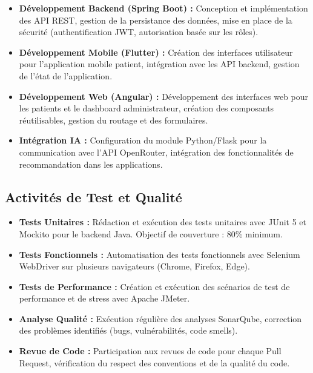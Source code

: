 \documentclass[12pt,a4paper]{report}
\begin{document}
\begin{itemize}
    \item \textbf{Développement Backend (Spring Boot) :} Conception et implémentation des API REST, gestion de la persistance des données, mise en place de la sécurité (authentification JWT, autorisation basée sur les rôles).
    
    \item \textbf{Développement Mobile (Flutter) :} Création des interfaces utilisateur pour l'application mobile patient, intégration avec les API backend, gestion de l'état de l'application.
    
    \item \textbf{Développement Web (Angular) :} Développement des interfaces web pour les patients et le dashboard administrateur, création des composants réutilisables, gestion du routage et des formulaires.
    
    \item \textbf{Intégration IA :} Configuration du module Python/Flask pour la communication avec l'API OpenRouter, intégration des fonctionnalités de recommandation dans les applications.
\end{itemize}

\subsection{Activités de Test et Qualité}

\begin{itemize}
    \item \textbf{Tests Unitaires :} Rédaction et exécution des tests unitaires avec JUnit 5 et Mockito pour le backend Java. Objectif de couverture : 80\% minimum.
    
    \item \textbf{Tests Fonctionnels :} Automatisation des tests fonctionnels avec Selenium WebDriver sur plusieurs navigateurs (Chrome, Firefox, Edge).
    
    \item \textbf{Tests de Performance :} Création et exécution des scénarios de test de performance et de stress avec Apache JMeter.
    
    \item \textbf{Analyse Qualité :} Exécution régulière des analyses SonarQube, correction des problèmes identifiés (bugs, vulnérabilités, code smells).
    
    \item \textbf{Revue de Code :} Participation aux revues de code pour chaque Pull Request, vérification du respect des conventions et de la qualité du code.
\end{itemize}
\end{document}

